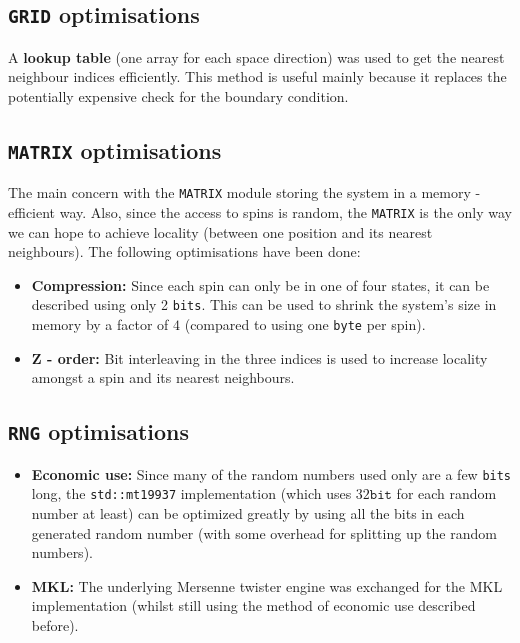 \documentclass[letterpaper]{article}
\begin{document}
\subsection{\texttt{GRID} optimisations} A \textbf{lookup table} (one array for each space direction) was used to get the nearest neighbour indices efficiently. This method is useful mainly because it replaces the potentially expensive check for the boundary condition.
\subsection{\texttt{MATRIX} optimisations} The main concern with the \texttt{MATRIX} module storing the system in a memory - efficient way. Also, since the access to spins is random, the \texttt{MATRIX} is the only way we can hope to achieve locality (between one position and its nearest neighbours). The following optimisations have been done:
\begin{itemize}[noitemsep, topsep = 0pt]
\item\textbf{Compression:} Since each spin can only be in one of four states, it can be described using only 2 \texttt{bits}. This can be used to shrink the system's size in memory by a factor of $4$ (compared to using one \texttt{byte} per spin).
\item{\textbf{Z - order:}} Bit interleaving in the three indices is used to increase locality amongst a spin and its nearest neighbours.
\end{itemize}
\subsection{\texttt{RNG} optimisations} \label{opt:rng}
\begin{itemize}[noitemsep, topsep = 0pt]
\item \textbf{Economic use:} Since many of the random numbers used only are a few \texttt{bits} long, the \texttt{std::mt19937} implementation (which uses $32 \mathtt{bit}$ for each random number at least) can be optimized greatly by using all the bits in each generated random number (with some overhead for splitting up the random numbers).
\item \textbf{MKL:} The underlying Mersenne twister engine was exchanged for the MKL implementation \cite{MKL} (whilst still using the method of economic use described before).
\end{itemize}
\end{document}

